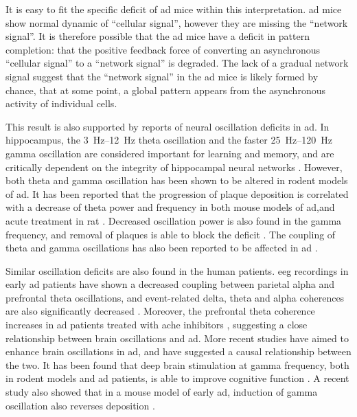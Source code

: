 It is easy to fit the specific deficit of \gls{ad} mice within this interpretation. \gls{ad} mice show normal dynamic of ``cellular signal'', however they are missing the ``network signal''. It is therefore possible that the \gls{ad} mice have a deficit in pattern completion: that the positive feedback force of converting an asynchronous ``cellular signal'' to a ``network signal'' is degraded. The lack of a gradual network signal suggest that the ``network signal'' in the \gls{ad} mice is likely formed by chance, that at some point, a global pattern appears from the asynchronous activity of individual cells. 


This result is also supported by reports of neural oscillation deficits in \gls{ad}. In hippocampus, the \SIrange{3}{12}{\hertz} theta oscillation and the faster \SIrange{25}{120}{\hertz} gamma oscillation are considered important for learning and memory, and are critically dependent on the integrity of hippocampal neural networks \citep{buzsaki02, colgin09}. However, both theta and gamma oscillation has been shown to be altered in rodent models of \gls{ad}. It has been reported that the progression of plaque deposition is correlated with a decrease of theta power and frequency in both mouse models of \gls{ad},and acute \abeta{} treatment in rat \citep{scott12, villette10}. Decreased oscillation power is also found in the gamma frequency, and removal of \abeta{} plaques is able to block the deficit \citep{driver07, kurudenkandy14}. The coupling of theta and gamma oscillations has also been reported to be affected in \gls{ad} \citep{goutagny13}. 

Similar oscillation deficits are also found in the human patients. \Gls{eeg} recordings in early \gls{ad} patients have shown a decreased coupling between parietal alpha and prefrontal theta oscillations, and event-related delta, theta and alpha coherences are also significantly decreased \citep{guntekin08, montez09}. Moreover, the prefrontal theta coherence increases in \gls{ad} patients treated with \gls{ache} inhibitors \citep{yener07}, suggesting a close relationship between brain oscillations and \gls{ad}. More recent studies have aimed to enhance brain oscillations in \gls{ad}, and have suggested a causal relationship between the two. It has been found that deep brain stimulation at gamma frequency, both in rodent models and \gls{ad} patients, is able to improve cognitive function \citep{suthana14}. A recent study also showed that in a mouse model of early \gls{ad}, induction of gamma oscillation also reverses \abeta{} deposition \citep{iaccarino16}. 

